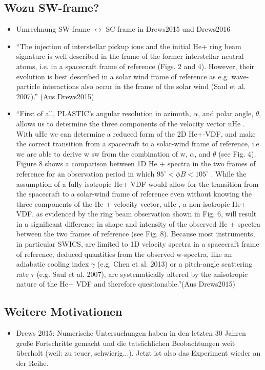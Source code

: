 \documentclass[]{article}
\begin{document}
\subsection{Wozu SW-frame?}
\begin{itemize}
	\item Umrechnung SW-frame $\leftrightarrow$ SC-frame in Drews2015 und Drews2016
	\item “The injection of interstellar pickup ions and the initial He+	ring beam signature is well described in the frame of the former	interstellar neutral atoms, i.e. in a spacecraft frame of reference (Figs. 2 and 4). However, their evolution is best described in a solar wind frame of reference as e.g. wave-particle interactions also occur in the frame of the solar wind (Saul et al. 2007).” (Aus Drews2015)
	\item “First of all, PLASTIC’s angular resolution in azimuth, $\alpha$, and polar angle, $\theta$, allows us to determine the three components of the velocity vector uHe . With uHe
	we can determine a reduced form of the 2D He+-VDF, and make
	the correct transition from a spacecraft to a solar-wind frame of reference, i.e. we are able to derive w sw from the combination	of w, $\alpha$, and $\theta$ (see Fig. 4). Figure 8 shows a comparison between 1D He + spectra in the two frames of reference for an observation period in which $95^\circ < \phi B < 105 ^\circ$ . While the assumption of a fully isotropic He+ VDF would allow for the transition from the spacecraft to a solar-wind frame of reference even without knowing the three components of the He + velocity vector, uHe , a non-isotropic He+ VDF, as evidenced by the ring beam observation shown in Fig. 6, will result in a significant difference in shape and intensity of the observed He + spectra between the two frames of reference (see Fig. 8). Because most instruments, in particular SWICS, are limited to 1D velocity spectra in a spacecraft frame of reference, deduced quantities from the
	observed w-spectra, like an adiabatic cooling index $\gamma$ (e.g. Chen et al. 2013) or a pitch-angle scattering rate $\tau$ (e.g. Saul et al.	2007), are systematically altered by the anisotropic nature of the He+ VDF and therefore questionable.”(Aus Drews2015)
\end{itemize}
%
%
%
\subsection{Weitere Motivationen}
\begin{itemize}
	\item Drews 2015: Numerische Untersuchungen haben in den letzten 30 Jahren große Fortschritte gemacht und die tatsächlichen Beobachtungen weit überholt (weil: zu teuer, schwierig...). Jetzt ist also das Experiment wieder an der Reihe. 
\end{itemize}
%
%
%
\newpage
\end{document}
